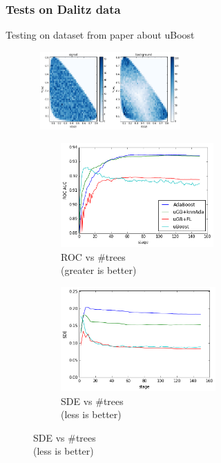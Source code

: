 \documentclass{beamer}
\begin{document}
\begin{frame}[t]
    \frametitle{Tests on Dalitz data}
    Testing on dataset from paper about uBoost

    \center
    \includegraphics[width=0.6\textwidth, height=3cm]{img/dalitz_distr.png}

    \begin{figure}
        \centering
        \begin{subfigure}[b]{0.48\textwidth}
            \includegraphics[width=\textwidth, height=4cm]{img/dalitz_roc_stage.png}
            \caption{ROC vs \#trees \\ 
             \; (greater is better)}
        \end{subfigure}
        \begin{subfigure}[b]{0.48\textwidth}
            \includegraphics[width=\textwidth, height=4cm]{img/dalitz_sde.png}
            \caption{SDE vs \#trees \\ 
             \; (less is better)}
        \end{subfigure}

    \end{figure}
 


\end{frame}
\end{document}
